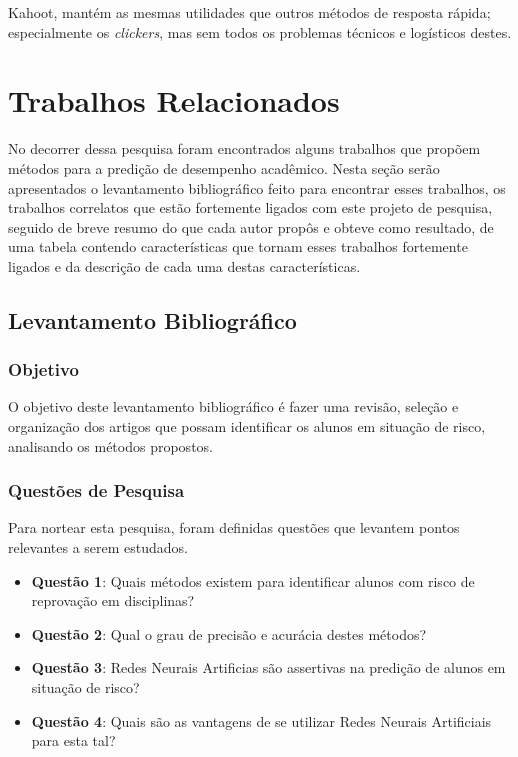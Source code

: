 \documentclass[
	12pt,				%
	openright,			%
	oneside,
	a4paper,			%
	english,			%
	french,				%
	spanish,			%
	brazil,				%
	]{abntex2}
\begin{document}

Kahoot, mantém as mesmas utilidades que outros métodos de resposta rápida; especialmente os \textit{clickers}, mas sem todos os problemas técnicos e logísticos destes. \cite{pintor2014kahoot}

\chapter{Trabalhos Relacionados}
\label{sec:TR}
No decorrer dessa pesquisa foram encontrados alguns trabalhos que propõem métodos para a predição de desempenho acadêmico. Nesta seção serão apresentados o levantamento bibliográfico feito para encontrar esses trabalhos, os trabalhos correlatos que estão fortemente ligados com este projeto de pesquisa, seguido de breve resumo do que cada autor propôs e obteve como resultado, de uma tabela contendo características que tornam esses trabalhos fortemente ligados e da descrição de cada uma destas características.

\section{Levantamento Bibliográfico}
\label{sec:L}
\subsection{Objetivo}
\label{sec:Obj}
O objetivo deste levantamento bibliográfico é fazer uma revisão, seleção e organização dos artigos que possam identificar os alunos em situação de risco, analisando os métodos propostos.

\subsection{Questões de Pesquisa}
\label{sec:QP}
Para nortear esta pesquisa, foram definidas questões que levantem pontos relevantes a serem estudados.
\begin{itemize}
    \item \textbf{Questão 1}: Quais métodos existem para identificar alunos com risco de reprovação em disciplinas?
    \item \textbf{Questão 2}: Qual o grau de precisão e acurácia destes métodos?
    \item \textbf{Questão 3}: Redes Neurais Artificias são assertivas na predição de alunos em situação de risco?
    \item \textbf{Questão 4}: Quais são as vantagens de se utilizar Redes Neurais Artificiais para esta tal?
\end{itemize}
\end{document}
